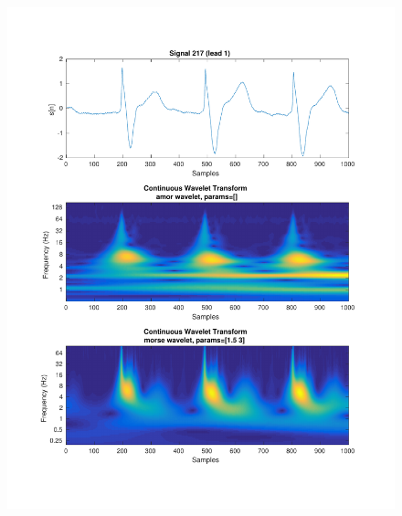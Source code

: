 \documentclass{beamer}
\begin{document}
\begin{frame}
\begin{columns}
\begin{figure}
\includegraphics[width=\textwidth]{fig/217l1_cwt.pdf}
\end{figure}
\end{columns}
\end{frame}
\end{document}
